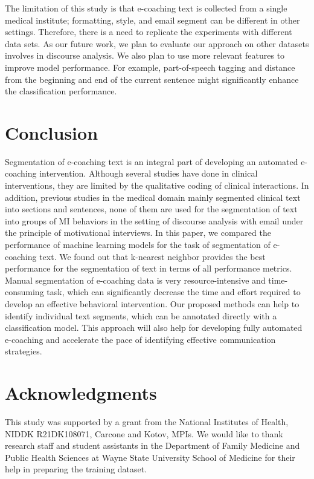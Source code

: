 \documentclass{amia}
\begin{document}
The limitation of this study is that e-coaching text is collected from a single medical institute; formatting, style, and email segment can be different in other settings. Therefore, there is a need to replicate the experiments with different data sets. As our future work, we plan to evaluate our approach on other datasets involves in discourse analysis. We also plan to use more relevant features to improve model performance. For example, part-of-speech tagging\cite{hasan2016feedback} and distance from the beginning and end of the current sentence might significantly enhance the classification performance. 
 
\section*{Conclusion}
Segmentation of e-coaching text is an integral part of developing an automated e-coaching intervention. Although several studies have done in clinical interventions, they are limited by the qualitative coding of clinical interactions. In addition, previous studies in the medical domain mainly segmented clinical text into sections and sentences, none of them are used for the segmentation of text into groups of MI behaviors in the setting of discourse analysis with email under the principle of motivational interviews. In this paper, we compared the performance of machine learning models for the task of segmentation of e-coaching text. We found out that k-nearest neighbor provides the best performance for the segmentation of text in terms of all performance metrics. Manual segmentation of e-coaching data is very resource-intensive and time-consuming task, which can significantly decrease the time and effort required to develop an effective behavioral intervention. Our proposed methods can help to identify individual text segments, which can be annotated directly with a classification model. This approach will also help for developing fully automated e-coaching and accelerate the pace of identifying effective communication strategies.

\section*{Acknowledgments}
This study was supported by a grant from the National Institutes of Health, NIDDK R21DK108071, Carcone and Kotov, MPIs. We would like to thank research staff and student assistants in the Department of Family Medicine and Public Health Sciences at Wayne State University School of Medicine for their help in preparing the training dataset. 



\end{document}
